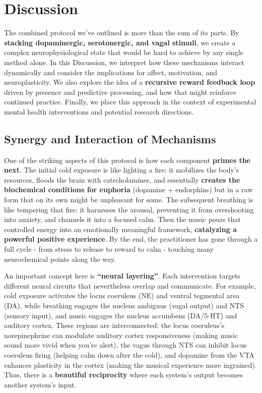 \documentclass[11pt]{article}
\newcommand{\quotes}[1]{``#1''}
\begin{document}
\section{Discussion}

The combined protocol we've outlined is more than the sum of its parts. By \textbf{stacking dopaminergic, serotonergic, and vagal stimuli}, we create a complex neurophysiological state that would be hard to achieve by any single method alone. In this Discussion, we interpret how these mechanisms interact dynamically and consider the implications for affect, motivation, and neuroplasticity. We also explore the idea of a \textbf{recursive reward feedback loop} driven by presence and predictive processing, and how that might reinforce continued practice. Finally, we place this approach in the context of experimental mental health interventions and potential research directions.

\subsection{Synergy and Interaction of Mechanisms}

One of the striking aspects of this protocol is how each component \textbf{primes the next}. The initial cold exposure is like lighting a fire: it mobilizes the body's resources, floods the brain with catecholamines, and essentially \textbf{creates the biochemical conditions for euphoria} (dopamine + endorphins) but in a raw form that on its own might be unpleasant for some. The subsequent breathing is like tempering that fire: it harnesses the arousal, preventing it from overshooting into anxiety, and channels it into a focused calm. Then the music pours that controlled energy into an emotionally meaningful framework, \textbf{catalyzing a powerful positive experience}. By the end, the practitioner has gone through a full cycle - from stress to release to reward to calm - touching many neurochemical points along the way.

An important concept here is \textbf{\quotes{neural layering}}. Each intervention targets different neural circuits that nevertheless overlap and communicate. For example, cold exposure activates the locus coeruleus (NE) and ventral tegmental area (DA), while breathing engages the nucleus ambiguus (vagal output) and NTS (sensory input), and music engages the nucleus accumbens (DA/5-HT) and auditory cortex. These regions are interconnected: the locus coeruleus's norepinephrine can modulate auditory cortex responsiveness (making music sound more vivid when you're alert), the vagus through NTS can inhibit locus coeruleus firing (helping calm down after the cold), and dopamine from the VTA enhances plasticity in the cortex (making the musical experience more ingrained). Thus, there is a \textbf{beautiful reciprocity} where each system's output becomes another system's input.
\end{document}
